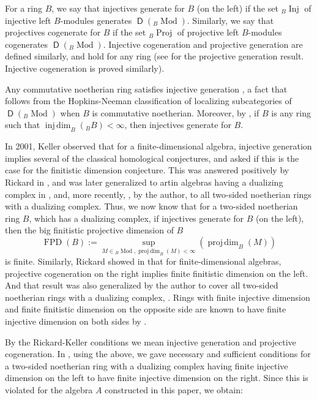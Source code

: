 \documentclass{amsart}
\theoremstyle{definition}
\newcommand{\opn}{\operatorname}
\newcommand{\cat}[1]{\operatorname{\mathsf{#1}}}
\newcommand{\injdim}{\operatorname{inj\,dim}}
\newcommand{\projdim}{\operatorname{proj\,dim}}
\numberwithin{equation}{section}
\begin{document}
For a ring $B$, we say that injectives generate for $B$ (on the left) if the set ${}_B \opn{Inj}$ of injective left $B$-modules generates $\cat{D}({}_B \opn{Mod})$. Similarly, we say that projectives cogenerate for $B$ if the set ${}_B \opn{Proj}$ of projective left $B$-modules cogenerates
$\cat{D}({}_B \opn{Mod})$. 
Injective cogeneration and projective generation are defined similarly,
and hold for any ring (see \cite[Proposition 2.2]{Rickard} for the projective generation result. Injective cogeneration is proved similarly).

Any commutative noetherian ring satisfies injective generation \cite[Theorem 3.3]{Rickard}, 
a fact that follows from the Hopkins-Neeman \cite{Hopkinsglobal,Neeman92} classification of localizing subcategories of $\cat{D}({}_B \opn{Mod})$ when $B$ is commutative noetherian.
Moreover, by \cite[Theorem 3.2]{Rickard}, if $B$ is any ring such that $\injdim_B({}_B B) < \infty$, then injectives generate for $B$.

In 2001, Keller \cite{Keller01} observed that for a finite-dimensional algebra, injective generation implies several of the classical homological conjectures, and asked if this is the case for the finitistic dimension conjecture. This was answered positively by Rickard in \cite[Theorem 4.3]{Rickard}, and was later generalized to artin algebras having a dualizing complex in \cite{Zhang}, 
and, more recently, \cite{ShFinDim}, by the author, to all two-sided noetherian rings with a dualizing complex.
Thus, we now know that for a two-sided noetherian ring $B$, which has a dualizing complex,
if injectives generate for $B$ (on the left), then the big finitistic projective dimension of $B$
\[
\opn{FPD}(B) := \sup_{M \in {}_B\opn{Mod}, \projdim_B(M) < \infty}(\projdim_B(M))
\]
is finite. 
Similarly, Rickard showed in \cite[Proposition 5.2]{Rickard} that for finite-dimensional algebras, 
projective cogeneration on the right implies finite finitistic dimension on the left.
And that result was also generalized by the author to cover all two-sided noetherian rings with a dualizing complex, \cite[Theorem 5.1]{ShGor}. Rings with finite injective dimension and finite finitistic dimension on the opposite side are known to have finite injective dimension on both sides by \cite[Proposition 6.10]{AusRei}.

By the Rickard-Keller conditions we mean injective generation and projective cogeneration.
In \cite[Theorem 6.3]{ShGor}, using the above, we gave necessary and sufficient conditions for a two-sided noetherian ring with a dualizing complex having finite injective dimension on the left to have finite injective dimension on the right. Since this is violated for the algebra $A$ constructed in this paper, we obtain:
\end{document}
